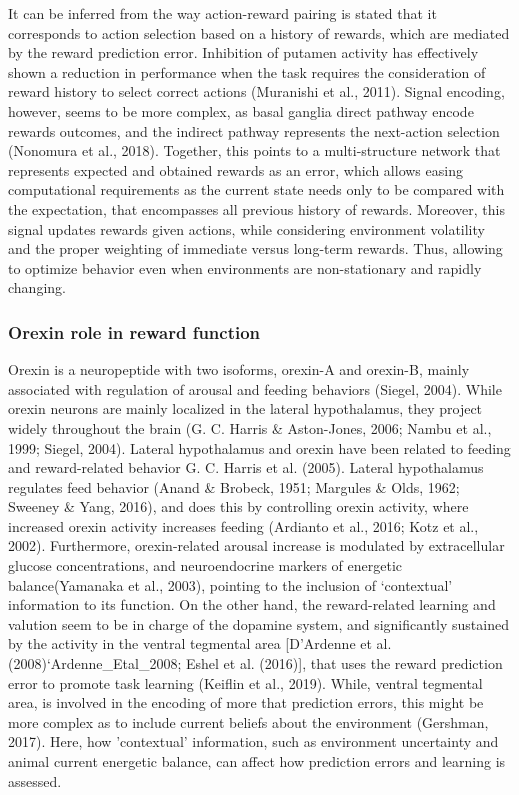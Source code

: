 \documentclass[
]{/home/nicoluarte/Downloads/templates/PNAS-template-main.tex}
\begin{document}
It can be inferred from the way action-reward pairing is stated that it
corresponds to action selection based on a history of rewards, which are
mediated by the reward prediction error. Inhibition of putamen activity
has effectively shown a reduction in performance when the task requires
the consideration of reward history to select correct actions (Muranishi
et al., 2011). Signal encoding, however, seems to be more complex, as
basal ganglia direct pathway encode rewards outcomes, and the indirect
pathway represents the next-action selection (Nonomura et al., 2018).
Together, this points to a multi-structure network that represents
expected and obtained rewards as an error, which allows easing
computational requirements as the current state needs only to be
compared with the expectation, that encompasses all previous history of
rewards. Moreover, this signal updates rewards given actions, while
considering environment volatility and the proper weighting of immediate
versus long-term rewards. Thus, allowing to optimize behavior even when
environments are non-stationary and rapidly changing.

\hypertarget{orexin-role-in-reward-function}{%
\subsubsection{Orexin role in reward
function}\label{orexin-role-in-reward-function}}

Orexin is a neuropeptide with two isoforms, orexin-A and orexin-B,
mainly associated with regulation of arousal and feeding behaviors
(Siegel, 2004). While orexin neurons are mainly localized in the lateral
hypothalamus, they project widely throughout the brain (G. C. Harris \&
Aston-Jones, 2006; Nambu et al., 1999; Siegel, 2004). Lateral
hypothalamus and orexin have been related to feeding and reward-related
behavior G. C. Harris et al. (2005). Lateral hypothalamus regulates feed
behavior (Anand \& Brobeck, 1951; Margules \& Olds, 1962; Sweeney \&
Yang, 2016), and does this by controlling orexin activity, where
increased orexin activity increases feeding (Ardianto et al., 2016; Kotz
et al., 2002). Furthermore, orexin-related arousal increase is modulated
by extracellular glucose concentrations, and neuroendocrine markers of
energetic balance(Yamanaka et al., 2003), pointing to the inclusion of
`contextual' information to its function. On the other hand, the
reward-related learning and valution seem to be in charge of the
dopamine system, and significantly sustained by the activity in the
ventral tegmental area {[}D'Ardenne et al. (2008)`Ardenne\_Etal\_2008;
Eshel et al. (2016){]}, that uses the reward prediction error to promote
task learning (Keiflin et al., 2019). While, ventral tegmental area, is
involved in the encoding of more that prediction errors, this might be
more complex as to include current beliefs about the environment
(Gershman, 2017). Here, how 'contextual' information, such as
environment uncertainty and animal current energetic balance, can affect
how prediction errors and learning is assessed.
\end{document}
